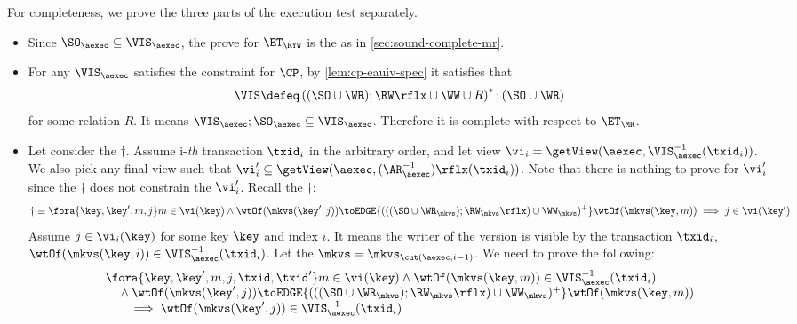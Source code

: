     
For completeness, we prove the three parts of the execution test separately.
\begin{itemize}
\item Since \( \SO_\aexec \subseteq \VIS_\aexec  \), the prove for \( \ET_\RYW \) is the as in \cref{sec:sound-complete-mr}.
\item For any \( \VIS_\aexec \)  satisfies the constraint for \( \CP \), by \cref{lem:cp-eauiv-spec} it satisfies that 
\[
    \VIS \defeq \left( (\SO \cup \WR ) ; \RW\rflx \cup \WW \cup R \right)^* ; (\SO \cup \WR )
\]
for some relation \( R \).
It means \( \VIS_\aexec ; \SO_\aexec \subseteq \VIS_\aexec \).
Therefore it is complete with respect to \( \ET_\MR \).

\item Let consider the \( \dagger \).
Assume i-\emph{th} transaction \( \txid_i \) in the arbitrary order,
and let view \( \vi_{i} = \getView(\aexec, \VIS^{-1}_{\aexec}(\txid_{i}) ) \).
We also pick any final view such that \( \vi'_{i} \subseteq \getView(\aexec, (\AR^{-1}_{\aexec})\rflx(\txid_{i}) ) \).
Note that there is nothing to prove for \( \vi'_i \) since the \( \dagger \) does not constrain the \( \vi'_i \).
Recall the \( \dagger \):
\[
\dagger  \equiv 
        \fora{\key, \key', m, j}
             m \in \vi(\key)  \wedge \wtOf(\mkvs(\key', j)) \toEDGE{(((\SO \cup \WR_{\mkvs}) ; \RW_{\mkvs}\rflx) \cup \WW_{\mkvs})^{+}} \wtOf(\mkvs(\key, m))
         \implies j \in \vi(\key')  
\]
Assume \( j \in \vi_i(\key) \) for some key \(\key \) and index \( i \).
It means the writer of the version is visible by the transaction \( \txid_i\),
\ie \( \wtOf(\mkvs(\key,i)) \in \VIS^{-1}_{\aexec}(\txid_{i}) \).
Let the \( \mkvs = \mkvs_{\cut(\aexec, i-1)} \).
We need to prove the following:
\begin{gather}
    \label{equ:cp-complete-arvis}
    \begin{array}{@{}l@{}}
        \fora{\key, \key', m, j, \txid, \txid'} 
        m \in \vi(\key) 
        \land \wtOf(\mkvs(\key,m)) \in \VIS_\aexec^{-1}(\txid_i) \\
        \quad {} \land \wtOf(\mkvs(\key', j)) \toEDGE{(((\SO \cup \WR_{\mkvs}) ; \RW_{\mkvs}\rflx) \cup \WW_{\mkvs})^{+}} \wtOf(\mkvs(\key, m)) \\
            \qquad \implies \wtOf(\mkvs(\key',j)) \in \VIS_\aexec^{-1}(\txid_i)
    \end{array}
\end{gather}

\end{itemize}

